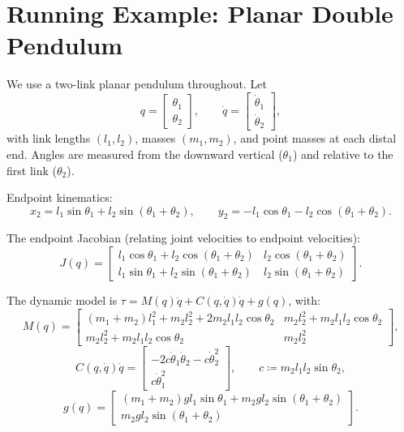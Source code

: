 \documentclass[11pt]{article}
\begin{document}
\section{Running Example: Planar Double Pendulum}\label{sec:double-pendulum}

We use a two-link planar pendulum throughout. Let
\begin{equation}\label{eq:dp-coords}
q = \begin{bmatrix}\theta_1 \\ \theta_2\end{bmatrix}, \qquad
\dot{q} = \begin{bmatrix}\dot\theta_1 \\ \dot\theta_2\end{bmatrix},
\end{equation}
with link lengths $(l_1,l_2)$, masses $(m_1,m_2)$, and point masses at each distal end. Angles are measured from the downward vertical ($\theta_1$) and relative to the first link ($\theta_2$).

Endpoint kinematics:
\begin{equation}\label{eq:dp-kinematics}
x_2 = l_1\sin\theta_1 + l_2\sin(\theta_1+\theta_2), \qquad
y_2 = -l_1\cos\theta_1 - l_2\cos(\theta_1+\theta_2).
\end{equation}

The endpoint Jacobian (relating joint velocities to endpoint velocities):
\begin{equation}\label{eq:dp-jacobian}
J(q) = \begin{bmatrix}
l_1\cos\theta_1 + l_2\cos(\theta_1+\theta_2) & l_2\cos(\theta_1+\theta_2) \\
l_1\sin\theta_1 + l_2\sin(\theta_1+\theta_2) & l_2\sin(\theta_1+\theta_2)
\end{bmatrix}.
\end{equation}

The dynamic model is $\tau = M(q)\ddot{q} + C(q,\dot{q})\dot{q} + g(q)$, with:
\begin{equation}\label{eq:dp-mass}
M(q) = \begin{bmatrix}
(m_1+m_2)l_1^2 + m_2l_2^2 + 2m_2l_1l_2\cos\theta_2 & m_2l_2^2+m_2l_1l_2\cos\theta_2 \\
m_2l_2^2+m_2l_1l_2\cos\theta_2 & m_2l_2^2
\end{bmatrix},
\end{equation}
\begin{equation}\label{eq:dp-coriolis}
C(q,\dot{q})\dot{q} = \begin{bmatrix}
-2c\dot\theta_1\dot\theta_2 - c\dot\theta_2^2 \\
c\dot\theta_1^2
\end{bmatrix}, \qquad
c \coloneqq m_2l_1l_2\sin\theta_2,
\end{equation}
\begin{equation}\label{eq:dp-gravity}
g(q) = \begin{bmatrix}
(m_1+m_2)gl_1\sin\theta_1 + m_2gl_2\sin(\theta_1+\theta_2) \\
m_2gl_2\sin(\theta_1+\theta_2)
\end{bmatrix}.
\end{equation}
\end{document}
